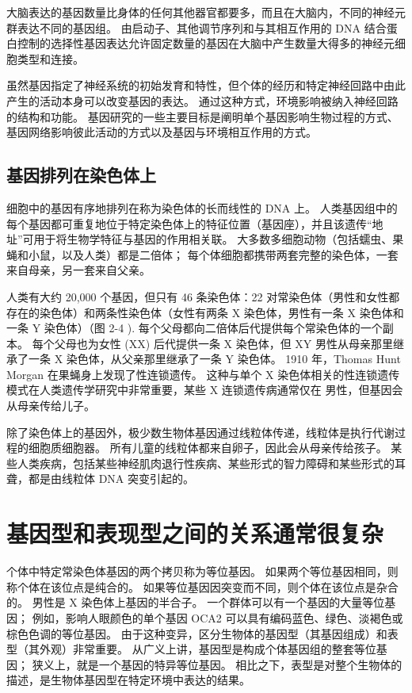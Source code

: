 大脑表达的基因数量比身体的任何其他器官都要多，而且在大脑内，不同的神经元群表达不同的基因组。 
由启动子、其他调节序列和与其相互作用的 DNA 结合蛋白控制的选择性基因表达允许固定数量的基因在大脑中产生数量大得多的神经元细胞类型和连接。


虽然基因指定了神经系统的初始发育和特性，但个体的经历和特定神经回路中由此产生的活动本身可以改变基因的表达。 
通过这种方式，环境影响被纳入神经回路的结构和功能。 
基因研究的一些主要目标是阐明单个基因影响生物过程的方式、基因网络影响彼此活动的方式以及基因与环境相互作用的方式。



\subsection{基因排列在染色体上}

细胞中的基因有序地排列在称为染色体的长而线性的 DNA 上。 
人类基因组中的每个基因都可重复地位于特定染色体上的特征位置（基因座），并且该遗传“地址”可用于将生物学特征与基因的作用相关联。 
大多数多细胞动物（包括蠕虫、果蝇和小鼠，以及人类）都是二倍体； 
每个体细胞都携带两套完整的染色体，一套来自母亲，另一套来自父亲。


人类有大约 20,000 个基因，但只有 46 条染色体：22 对常染色体（男性和女性都存在的染色体）和两条性染色体（女性有两条 X 染色体，男性有一条 X 染色体和一条 Y 染色体）（图 2-4 ). 每个父母都向二倍体后代提供每个常染色体的一个副本。 
每个父母也为女性 (XX) 后代提供一条 X 染色体，但 XY 男性从母亲那里继承了一条 X 染色体，从父亲那里继承了一条 Y 染色体。 
1910 年，Thomas Hunt Morgan 在果蝇身上发现了性连锁遗传。
这种与单个 X 染色体相关的性连锁遗传模式在人类遗传学研究中非常重要，某些 X 连锁遗传病通常仅在 男性，但基因会从母亲传给儿子。


除了染色体上的基因外，极少数生物体基因通过线粒体传递，线粒体是执行代谢过程的细胞质细胞器。 
所有儿童的线粒体都来自卵子，因此会从母亲传给孩子。 某些人类疾病，包括某些神经肌肉退行性疾病、某些形式的智力障碍和某些形式的耳聋，都是由线粒体 DNA 突变引起的。


\section{基因型和表现型之间的关系通常很复杂}

个体中特定常染色体基因的两个拷贝称为等位基因。 如果两个等位基因相同，则称个体在该位点是纯合的。 如果等位基因因突变而不同，则个体在该位点是杂合的。 男性是 X 染色体上基因的半合子。 一个群体可以有一个基因的大量等位基因； 例如，影响人眼颜色的单个基因 OCA2 可以具有编码蓝色、绿色、淡褐色或棕色色调的等位基因。 由于这种变异，区分生物体的基因型（其基因组成）和表型（其外观）非常重要。 从广义上讲，基因型是构成个体基因组的整套等位基因； 狭义上，就是一个基因的特异等位基因。 相比之下，表型是对整个生物体的描述，是生物体基因型在特定环境中表达的结果。

